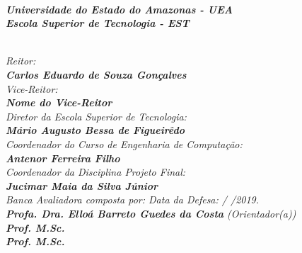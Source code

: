 \begin{spacing}{1.4}
\textit{\textbf{\\
Universidade do Estado do Amazonas - UEA\\
Escola Superior de Tecnologia - EST}}

\textit{\\
Reitor:\\
\textbf{
Carlos Eduardo de Souza Gon\c{c}alves}\\
Vice-Reitor:\\ \textbf{Nome do Vice-Reitor}}
\\
\textit{
Diretor da Escola Superior de Tecnologia:\\
\textbf{M\'{a}rio Augusto Bessa de Figueir\^{e}do}}
\\
\textit{
Coordenador do Curso de Engenharia de Computa\c{c}\~{a}o:\\
\textbf{Antenor Ferreira Filho}}
\\
\textit{
Coordenador da Disciplina Projeto Final:\\
\textbf{Jucimar Maia da Silva J\'{u}nior}}
\\[12pt]
\textit{
Banca Avaliadora composta por: \hfill Data da Defesa:  /  /2019.\\
}
\textit{
\textbf{Profa. Dra. Elloá Barreto Guedes da Costa} (Orientador(a))\\
\textbf{Prof. M.Sc. }\\%
\textbf{Prof. M.Sc. }
}
\ \ \\
 \begin{small}
\begin{center}
\end{center}
\end{small}
\end{spacing}
 \newpage
